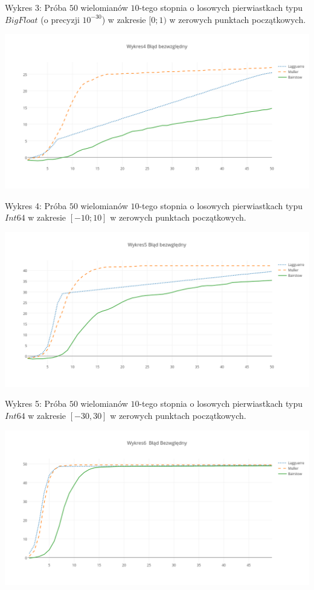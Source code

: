 \documentclass{article}
\begin{document}
Wykres 3:
Próba $50$ wielomianów $10$-tego stopnia o losowych pierwiastkach typu  $BigFloat$ (o precyzji $10^{-30}$) w zakresie $[0;1)$ w zerowych punktach początkowych.

\includegraphics[scale=0.45]{W4.png}

Wykres 4:
Próba $50$ wielomianów $10$-tego stopnia o losowych pierwiastkach typu $Int64$ w zakresie $[-10;10]$ w zerowych punktach początkowych.

\includegraphics[scale=0.45]{W5.png}

Wykres 5:
Próba $50$ wielomianów $10$-tego stopnia o losowych pierwiastkach typu $Int64$ w zakresie $[-30,30]$ w zerowych punktach początkowych.

\includegraphics[scale=0.45]{W6.png}
\end{document}
